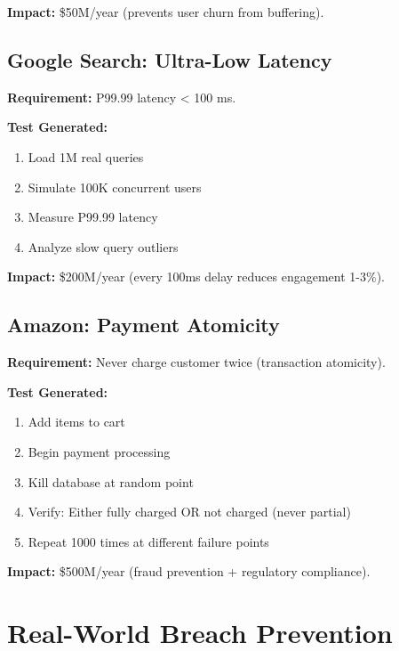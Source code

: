 \documentclass[12pt,oneside]{report}
\begin{document}
\textbf{Impact:} \$50M/year (prevents user churn from buffering).

\subsection{Google Search: Ultra-Low Latency}

\textbf{Requirement:} P99.99 latency \textless{} 100 ms.

\textbf{Test Generated:}
\begin{enumerate}
    \item Load 1M real queries
    \item Simulate 100K concurrent users
    \item Measure P99.99 latency
    \item Analyze slow query outliers
\end{enumerate}

\textbf{Impact:} \$200M/year (every 100ms delay reduces engagement 1-3\%).

\subsection{Amazon: Payment Atomicity}

\textbf{Requirement:} Never charge customer twice (transaction atomicity).

\textbf{Test Generated:}
\begin{enumerate}
    \item Add items to cart
    \item Begin payment processing
    \item Kill database at random point
    \item Verify: Either fully charged OR not charged (never partial)
    \item Repeat 1000 times at different failure points
\end{enumerate}

\textbf{Impact:} \$500M/year (fraud prevention + regulatory compliance).

\section{Real-World Breach Prevention}
\end{document}
